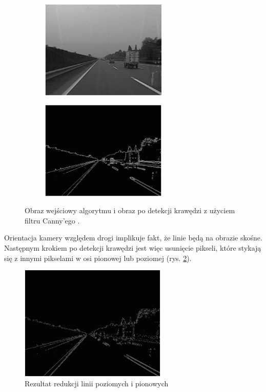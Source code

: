 \begin{figure}[h]
	\centering
	\begin{subfigure}{0.35\textwidth}
		\centering
		\includegraphics[width=6cm]{img/lane_detection2_input.png}
		\subcaption{\label{fig:lane_detection2_input}}
	\end{subfigure}
	\begin{subfigure}{0.35\textwidth}
		\centering
		\includegraphics[width=6cm]{img/lane_detection2_canny.png}
		\subcaption{\label{fig:lane_detection2_canny}}
	\end{subfigure}
	
	\caption{\label{fig:details}Obraz wejściowy algorytmu \protect{} i obraz po detekcji krawędzi z użyciem filtru Canny'ego \protect{}.\cite{T6}}
\end{figure}

Orientacja kamery względem drogi implikuje fakt, że linie będą na obrazie skośne. 
Następnym krokiem po detekcji krawędzi jest więc usunięcie pikseli, które stykają się z innymi pikselami w osi pionowej lub poziomej (rys. \ref{fig:lane_detection2_noise1}).

\begin{figure}
  \centering
  \includegraphics[width=7cm]{img/lane_detection2_noise1.png}
  \caption{Rezultat redukcji linii poziomych i pionowych\cite{T6}}
  \label{fig:lane_detection2_noise1}
\end{figure}

